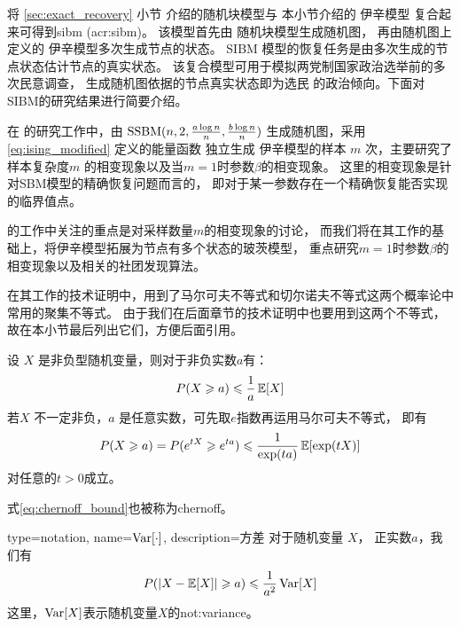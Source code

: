 将 \ref{sec:exact_recovery} 小节 介绍的随机块模型与 本小节介绍的 伊辛模型
复合起来可得到\gls{sibm} (\gls{acr:sibm})\cite{ye2020exact}。
该模型首先由 随机块模型生成随机图，
再由随机图上定义的 伊辛模型多次生成节点的状态。
SIBM 模型的恢复任务是由多次生成的节点状态估计节点的真实状态。
该复合模型可用于模拟两党制国家政治选举前的多次民意调查，
生成随机图依据的节点真实状态即为选民
的政治倾向。下面对SIBM的研究结果进行简要介绍。

在\citet{ye2020exact} 的研究工作中，由 $\operatorname{SSBM}(n,2,\frac{a \log n}{n}, \frac{b \log n}{n})$
生成随机图，采用 \eqref{eq:ising_modified} 定义的能量函数
独立生成 伊辛模型的样本 $m$ 次，主要研究了样本复杂度$m$
的相变现象以及当$m=1$时参数$\beta$的相变现象。
这里的相变现象是针对SBM模型的精确恢复问题而言的，
即对于某一参数存在一个精确恢复能否实现的临界值点。

\citet{ye2020exact} 的工作中关注的重点是对采样数量$m$的相变现象的讨论，
而我们将在其工作的基础上，将伊辛模型拓展为节点有多个状态的玻茨模型，
重点研究$m=1$时参数$\beta$的相变现象以及相关的社团发现算法。

\citet{ye2020exact} 在其工作的技术证明中，用到了马尔可夫不等式和切尔诺夫不等式这两个概率论中常用的聚集不等式。
由于我们在后面章节的技术证明中也要用到这两个不等式，故在本小节最后列出它们，方便后面引用。

\begin{lemma} 
  设 $X$ 是非负型随机变量，则对于非负实数$a$有：
  \begin{equation}
    P(X\geqslant a) \leqslant {1 \over a} \operatorname{\mathbb{E}}[X]   
  \end{equation}
   若$X$ 不一定非负，$a$ 是任意实数，可先取$e$指数再运用马尔可夫不等式，
   即有
   \begin{equation}\label{eq:chernoff_bound}
    P(X\geqslant a) = P(e^{tX} \geqslant e^{ta}) \leqslant { 1 \over \exp(ta)} \operatorname{\mathbb{E}}[\exp(tX)]
   \end{equation}
   对任意的$t>0$成立。

   式\eqref{eq:chernoff_bound}也被称为\gls{chernoff}。
\end{lemma}
\begin{lemma}
{
  type=notation,
  name={$\operatorname{\mathrm{Var}}[\cdot]$},
  description={方差}
}
  对于随机变量 $X$， 正实数$a$，我们有
  \begin{equation}
    P(\lvert X-\operatorname{\mathbb{E}}[X]\rvert \geqslant a) \leqslant {1 \over a^2} \operatorname{\mathrm{Var}}[X]
  \end{equation}
  这里，$\operatorname{\mathrm{Var}}[X]$表示随机变量$X$的\glsdesc{not:variance}。
\end{lemma}

